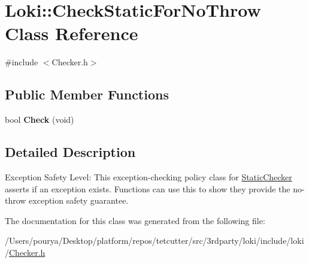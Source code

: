 \hypertarget{classLoki_1_1CheckStaticForNoThrow}{}\section{Loki\+:\+:Check\+Static\+For\+No\+Throw Class Reference}
\label{classLoki_1_1CheckStaticForNoThrow}


{\ttfamily \#include $<$Checker.\+h$>$}

\subsection*{Public Member Functions}
\begin{DoxyCompactItemize}
\item 
\hypertarget{classLoki_1_1CheckStaticForNoThrow_a0af1f69a6ae4fadf7ffa74d9d116a967}{}bool {\bfseries Check} (void)\label{classLoki_1_1CheckStaticForNoThrow_a0af1f69a6ae4fadf7ffa74d9d116a967}

\end{DoxyCompactItemize}


\subsection{Detailed Description}
\begin{DoxyParagraph}{Exception Safety Level\+:}
This exception-\/checking policy class for \hyperlink{classLoki_1_1StaticChecker}{Static\+Checker} asserts if an exception exists. Functions can use this to show they provide the no-\/throw exception safety guarantee. 
\end{DoxyParagraph}


The documentation for this class was generated from the following file\+:\begin{DoxyCompactItemize}
\item 
/\+Users/pourya/\+Desktop/platform/repos/tetcutter/src/3rdparty/loki/include/loki/\hyperlink{Checker_8h}{Checker.\+h}\end{DoxyCompactItemize}
